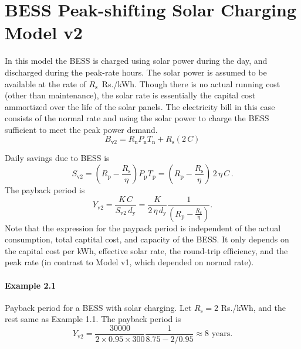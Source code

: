 \section{BESS Peak-shifting Solar Charging Model v2}
In this model the BESS is charged using solar power during the day, and
discharged during the peak-rate hours. The solar power is
assumed to be available at the rate of $R_{\text{s}}$~Rs./kWh. Though
there is no actual running cost (other than maintenance), the solar
rate is essentially the capital cost ammortized over the life of the
solar panels.  The electricity bill in this case consists of the normal rate 
and using the solar power to charge the BESS sufficient to meet the 
peak power demand.
\begin{equation}
    B_{\text{v2}} = 
    R_{\text{n}} P_{\text{n}} T_{\text{n}} +
    R_{\text{s}} (2 \, C)
\end{equation} 

Daily savings due to BESS is
\begin{equation}
    S_\text{v2} = \left(R_{\text{p}} - \frac{R_{\text{s}}}{\eta}\right) P_{\text{p}} T_{\text{p}} 
    = \left(R_{\text{p}} - \frac{R_{\text{s}}}{\eta}\right) \, 2 \, \eta \, C \, .
\end{equation}
The payback period is
\begin{equation}
    Y_\text{v2} = \frac{K \, C}{S_\text{v2} \, d_\text{y}} 
    = \frac{K}{2 \, \eta \, d_\text{y}} \frac{1}{\left(R_{\text{p}} - \frac{R_{\text{s}}}{\eta}\right)}.
\end{equation}
Note that the expression for the paypack period is independent of the
actual consumption, total captital cost, and capacity of the BESS. It
only depends on the capital cost per kWh, effective solar rate,
the round-trip efficiency, and the peak rate (in contrast to 
Model v1, which depended on normal rate).


\paragraph{Example 2.1} Payback period for a BESS with solar charging. 
Let $R_{\text{s}} = 2$ Rs./kWh, and the rest same as Example 1.1.
The payback period is
\begin{equation}
    Y_\text{v2} = \frac{30000}{2 \times 0.95 \times 300} 
    \frac{1}{8.75 - 2/0.95} \approx 8 \text{ years}.
\end{equation}


